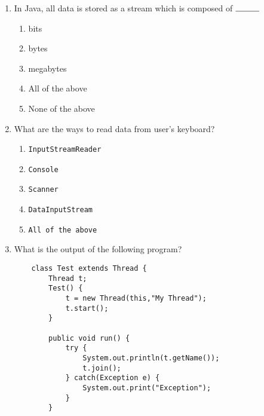 \documentclass[S17-Final.tex]{subfiles}
\begin{document}
\begin{enumerate}
\item In Java, all data is stored as a stream which is composed of $\rule{1cm}{0.15mm}$
	
\begin{enumerate}
\item  bits
\item  bytes
\item  megabytes
\item  All of the above
\item  None of the above
\end{enumerate}
\clearpage
\item What are the ways to read data from user's keyboard?
	
\begin{enumerate}
\item  \texttt{InputStreamReader}
\item  \texttt{Console}
\item  \texttt{Scanner}
\item  \texttt{DataInputStream}
\item  \texttt{All of the above}
\end{enumerate}

	

\item What is the output of the following program?
\begin{lstlisting}
    class Test extends Thread {
        Thread t;
        Test() {
            t = new Thread(this,"My Thread");
            t.start();
        }
        
        public void run() {
            try {
                System.out.println(t.getName());
                t.join();
            } catch(Exception e) {
                System.out.print("Exception");
            }
        }
        

\end{lstlisting}
\end{enumerate}
\end{document}
